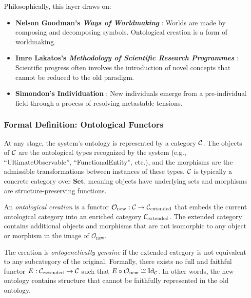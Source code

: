 Philosophically, this layer draws on:
\begin{itemize}
    \item \textbf{Nelson Goodman's \emph{Ways of Worldmaking}} \cite{goodman1978}: Worlds are made by composing and decomposing symbols. Ontological creation is a form of worldmaking.
    \item \textbf{Imre Lakatos's \emph{Methodology of Scientific Research Programmes}} \cite{lakatos1978}: Scientific progress often involves the introduction of novel concepts that cannot be reduced to the old paradigm.
    \item \textbf{Simondon's Individuation} \cite{simondon1992}: New individuals emerge from a pre-individual field through a process of resolving metastable tensions.
\end{itemize}

\subsubsection{Formal Definition: Ontological Functors}
\begin{definition}
At any stage, the system's ontology is represented by a category $\mathcal{C}$. The objects of $\mathcal{C}$ are the ontological types recognized by the system (e.g., ``UltimateObservable'', ``FunctionalEntity'', etc.), and the morphisms are the admissible transformations between instances of these types. $\mathcal{C}$ is typically a concrete category over $\mathbf{Set}$, meaning objects have underlying sets and morphisms are structure-preserving functions.
\end{definition}

\begin{definition}
An \emph{ontological creation} is a functor $\mathcal{O}_{\text{new}}: \mathcal{C} \to \mathcal{C}_{\text{extended}}$ that embeds the current ontological category into an enriched category $\mathcal{C}_{\text{extended}}$. The extended category contains additional objects and morphisms that are not isomorphic to any object or morphism in the image of $\mathcal{O}_{\text{new}}$.
\end{definition}

\begin{definition}
The creation is \emph{ontogenetically genuine} if the extended category is not equivalent to any subcategory of the original. Formally, there exists no full and faithful functor $E: \mathcal{C}_{\text{extended}} \to \mathcal{C}$ such that $E \circ \mathcal{O}_{\text{new}} \cong \text{Id}_{\mathcal{C}}$. In other words, the new ontology contains structure that cannot be faithfully represented in the old ontology.
\end{definition}

